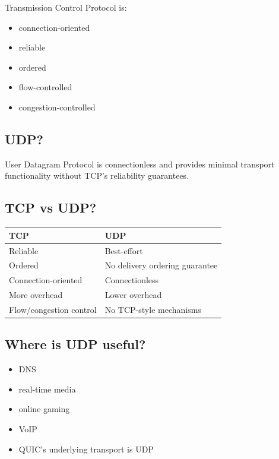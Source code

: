 Transmission Control Protocol is:

\begin{itemize}
  \item connection-oriented
  \item reliable
  \item ordered
  \item flow-controlled
  \item congestion-controlled
\end{itemize}

\medskip

\subsection{UDP?}

User Datagram Protocol is connectionless and provides minimal transport functionality without TCP's reliability guarantees.

\medskip

\subsection{TCP vs UDP?}

\begin{center}
\setlength{\tabcolsep}{6pt}
\renewcommand{\arraystretch}{1.2}
\begin{tabular}{|l|l|}
\hline
\textbf{TCP} & \textbf{UDP} \\
\hline
Reliable & Best-effort \\
Ordered & No delivery ordering guarantee \\
Connection-oriented & Connectionless \\
More overhead & Lower overhead \\
Flow/congestion control & No TCP-style mechanisms \\
\hline
\end{tabular}
\end{center}

\medskip

\subsection{Where is UDP useful?}

\begin{itemize}
  \item DNS
  \item real-time media
  \item online gaming
  \item VoIP
  \item QUIC's underlying transport is UDP
\end{itemize}

